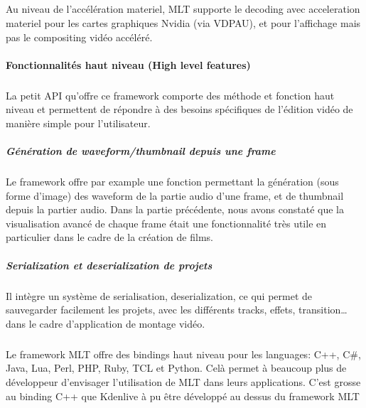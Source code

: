 \subparagraph{}

Au niveau de l'accélération materiel, MLT supporte le decoding
avec acceleration materiel pour les cartes graphiques Nvidia
 (via VDPAU), et pour l'affichage
mais pas le compositing vidéo accéléré.


\paragraph{Fonctionnalités haut niveau (High level features)}

\subparagraph{}

La petit API qu'offre ce framework comporte des méthode et fonction
haut niveau et permettent de répondre à des besoins spécifiques de
l'édition vidéo de manière simple pour l'utilisateur.

\subparagraph{Génération de waveform/thumbnail depuis une frame}

\subparagraph{}

Le framework offre par example une fonction permettant la génération
(sous forme d'image) des waveform de la partie audio d'une frame, et de
thumbnail depuis la partier audio.  Dans la partie précédente, nous
avons constaté que la visualisation avancé de chaque frame était une
fonctionnalité très utile en particulier dans le cadre de la création
de films.

\subparagraph{Serialization et deserialization de projets}

\subparagraph{}

Il intègre un système de serialisation, deserialization, ce qui permet
de sauvegarder facilement les projets, avec les différents tracks,
effets, transition\ldots dans le cadre d'application de montage vidéo.

\subparagraph{}

Le framework MLT offre des bindings haut niveau pour les languages:
C++, C\#, Java, Lua, Perl, PHP, Ruby, TCL et Python. Celà permet à
beaucoup plus de développeur d'envisager l'utilisation de MLT dans
leurs applications. C'est grosse au binding C++ que Kdenlive à pu être
développé au dessus du framework MLT

